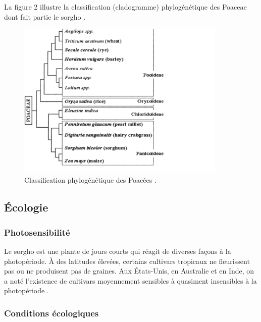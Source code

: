 \documentclass[a4paper,11pt]{article}
\begin{document}
La figure 2 illustre la classification (cladogramme) phylogénétique
des Poaceae dont fait partie le sorgho \cite{Paquet_2005}.



\begin{figure}%
  \begin{center}
    \includegraphics[width=10cm]{images/PoaceaePhylogeny}
  \end{center}
  \caption{Classification phylogénétique des Poacées \protect\cite{Paquet_2005}.}
\end{figure}


\subsection{Écologie}

\subsubsection{Photosensibilité}

Le sorgho est une plante de jours courts qui réagit de diverses façons
à la photopériode. À des latitudes élevées, certains cultivars
tropicaux ne fleurissent pas ou ne produisent pas de graines. Aux
États-Unis, en Australie et en Inde, on a noté l'existence de
cultivars moyennement sensibles à quasiment insensibles à la
photopériode \cite{BARRO_KONDOMBO_2010}.

\subsubsection{Conditions écologiques}
\end{document}
